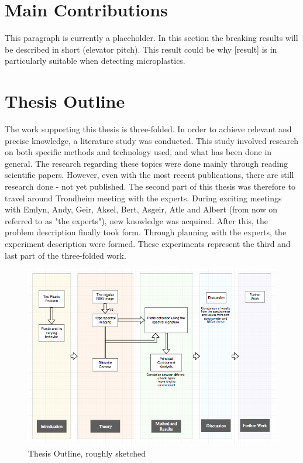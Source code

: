 \section{Main Contributions} This paragraph is currently a placeholder. In this section the breaking results will be described in short (elevator pitch). This result could be why [result] is in particularly suitable when detecting microplastics.


\section{Thesis Outline}
The work supporting this thesis is three-folded. In order to achieve relevant and precise knowledge, a literature study was conducted. This study involved research on both specific methods and technology used, and what has been done in general. The research regarding these topics were done mainly through reading scientific papers. However, even with the most recent publications, there are still research done - not yet published. The second part of this thesis was therefore to travel around Trondheim meeting with the experts. During exciting meetings with Emlyn, Andy, Geir, Aksel, Bert, Asgeir, Atle and Albert (from now on referred to as "the experts"), new knowledge was acquired. After this, the problem description finally took form. Through planning with the experts, the experiment description were formed. These experiments represent the third and last part of the three-folded work. 


\begin{figure}
  \includegraphics[width=\linewidth]{Images/outline.png}
  \caption{Thesis Outline, roughly sketched}
  \label{fig:outline}
\end{figure}

